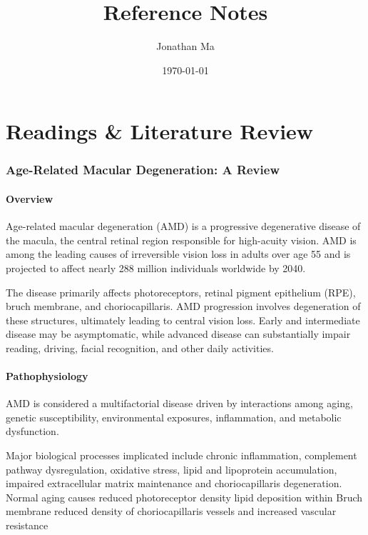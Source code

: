\documentclass[11pt]{article}
\title{\textbf{Reference Notes}}
\author{Jonathan Ma}
\date{\today}
\begin{document}
\maketitle
\tableofcontents
\newpage

\part{Readings \& Literature Review}

\section{Age-Related Macular Degeneration: A Review}

\subsection*{Overview}

Age-related macular degeneration (AMD) is a progressive degenerative disease of the macula, the central retinal region responsible for high-acuity vision. AMD is among the leading causes of irreversible vision loss in adults over age 55 and is projected to affect nearly 288 million individuals worldwide by 2040.

The disease primarily affects photoreceptors, retinal pigment epithelium (RPE), bruch membrane, and choriocapillaris.
AMD progression involves degeneration of these structures, ultimately leading to central vision loss. Early and intermediate disease may be asymptomatic, while advanced disease can substantially impair reading, driving, facial recognition, and other daily activities.  

\subsection*{Pathophysiology}

AMD is considered a multifactorial disease driven by interactions among aging, genetic susceptibility, environmental exposures, inflammation, and metabolic dysfunction.

Major biological processes implicated include chronic inflammation, complement pathway dysregulation, oxidative stress, lipid and lipoprotein accumulation, impaired extracellular matrix maintenance and choriocapillaris degeneration.
Normal aging causes reduced photoreceptor density lipid deposition within Bruch membrane reduced density of choriocapillaris vessels and increased vascular resistance
\end{document}

